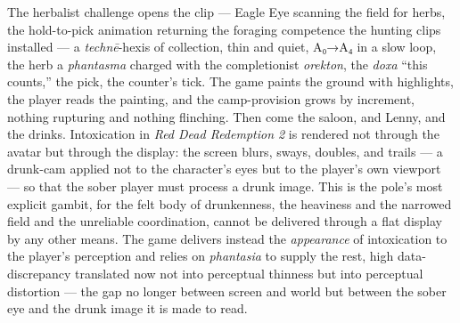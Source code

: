 The herbalist challenge opens the clip — Eagle Eye scanning the field for herbs, the hold-to-pick animation returning the foraging competence the hunting clips installed — a \textit{technē}-hexis of collection, thin and quiet, A₀→A₄ in a slow loop, the herb a \textit{phantasma} charged with the completionist \textit{orekton}, the \textit{doxa} ``this counts,'' the pick, the counter's tick. The game paints the ground with highlights, the player reads the painting, and the camp-provision grows by increment, nothing rupturing and nothing flinching. Then come the saloon, and Lenny, and the drinks. Intoxication in \textit{Red Dead Redemption 2} is rendered not through the avatar but through the display: the screen blurs, sways, doubles, and trails — a drunk-cam applied not to the character's eyes but to the player's own viewport — so that the sober player must process a drunk image. This is the pole's most explicit gambit, for the felt body of drunkenness, the heaviness and the narrowed field and the unreliable coordination, cannot be delivered through a flat display by any other means. The game delivers instead the \textit{appearance} of intoxication to the player's perception and relies on \textit{phantasia} to supply the rest, high data-discrepancy translated now not into perceptual thinness but into perceptual distortion — the gap no longer between screen and world but between the sober eye and the drunk image it is made to read.

